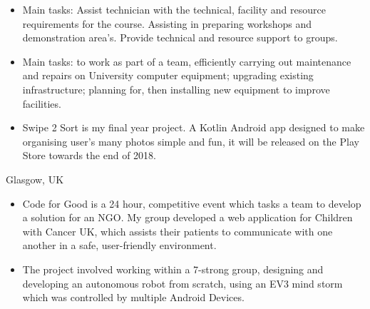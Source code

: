 \documentclass[8pt,a4paper]{altacv}
\begin{document}
\begin{itemize}
\item Main tasks: Assist technician with the technical, facility and resource requirements for the course. Assisting in preparing workshops and demonstration area's. Provide technical and resource support to groups. 
\divider
\end{itemize}

\begin{itemize}
\item Main tasks: to work as part of a team, efficiently carrying out maintenance and repairs on University computer equipment; upgrading existing infrastructure; planning for, then installing new equipment to improve facilities.
\end{itemize}



\begin{itemize}
\item Swipe 2 Sort is my final year project. A Kotlin Android app designed to make organising user's many photos simple and fun, it will be released on the Play Store towards the end of 2018.
\end{itemize}
\divider

  {Glasgow, UK}
\begin{itemize}
\item Code for Good is a 24 hour, competitive event which tasks a team to develop a solution for an NGO. My group developed a web application for Children with Cancer UK, which assists their patients to communicate with one another in a safe, user-friendly environment.
\end{itemize}
\divider

\begin{itemize}
\item The project involved working within a 7-strong group, designing and developing an autonomous robot from scratch, using an EV3 mind storm which was controlled by multiple Android Devices.
\end{itemize}
\divider
\end{document}
